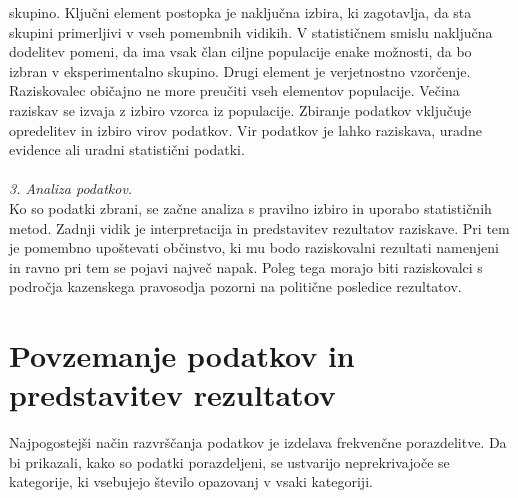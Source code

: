 \documentclass[12pt,a4paper]{amsart}
\theoremstyle{definition} %
\theoremstyle{plain} %
\begin{document}
skupino. Ključni element postopka je naključna izbira, ki zagotavlja, da sta skupini primerljivi v vseh pomembnih vidikih. V statističnem smislu 
naključna dodelitev pomeni, da ima vsak član ciljne populacije enake možnosti, da bo izbran v eksperimentalno skupino. Drugi element je verjetnostno 
vzorčenje. Raziskovalec običajno ne more preučiti vseh elementov populacije. Večina raziskav se izvaja z izbiro vzorca iz populacije. Zbiranje podatkov 
vključuje opredelitev in izbiro virov podatkov. Vir podatkov je lahko raziskava, uradne evidence ali uradni statistični podatki.\\\\
\textit{3. Analiza podatkov.\\}
Ko so podatki zbrani, se začne analiza s pravilno izbiro in uporabo statističnih metod. Zadnji vidik je interpretacija in predstavitev rezultatov 
raziskave. Pri tem je pomembno upoštevati občinstvo, ki mu bodo raziskovalni rezultati namenjeni in ravno pri tem se pojavi največ napak. Poleg tega 
morajo biti raziskovalci s področja kazenskega pravosodja pozorni na politične posledice rezultatov. 

\section{Povzemanje podatkov in predstavitev rezultatov}
Najpogostejši način razvrščanja podatkov je izdelava frekvenčne porazdelitve. Da bi prikazali, kako so podatki porazdeljeni, se ustvarijo 
neprekrivajoče se kategorije, ki vsebujejo število opazovanj v vsaki kategoriji. \\\\
\end{document}
